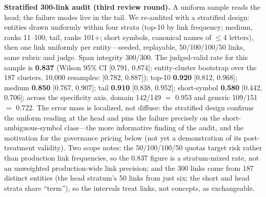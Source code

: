 \documentclass[preprint,12pt]{elsarticle}
\begin{document}
\textbf{Stratified 300-link audit (third review round).} A uniform
sample reads the head; the failure modes live in the tail. We
re-audited with a stratified design: entities drawn uniformly within
four strata (top-10 by link frequency; medium, ranks 11--100; tail,
ranks 101+; short symbols, canonical names of $\leq$4 letters), then one
link uniformly per entity---seeded, replayable, 50/100/100/50 links,
same rubric and judge. Span integrity 300/300. The judged-valid rate
for this sample is \textbf{0.837} (Wilson 95\% CI [0.791, 0.874];
entity-cluster bootstrap over the 187 clusters, 10{,}000 resamples:
[0.782, 0.887]);
top-10
\textbf{0.920} [0.812, 0.968]; medium \textbf{0.850} [0.767, 0.907];
tail \textbf{0.910} [0.838, 0.952]; short-symbol \textbf{0.580}
[0.442, 0.706]; across the specificity axis, domain 142/149 $=$ 0.953
and generic 109/151 $=$ 0.722. The error mass is localized, not
diffuse: the stratified design confirms the uniform reading at the head
and pins the failure precisely on the short-ambiguous-symbol
class---the more informative finding of the audit, and the motivation
for the governance pricing below (not yet a demonstration of its
post-treatment validity). Two scope notes: the 50/100/100/50 quotas
target risk rather than production link frequencies, so the 0.837
figure is a stratum-mixed rate, not an unweighted production-wide link
precision; and the 300 links come from 187 distinct entities (the head
stratum's 50 links from just six; the short and head strata share
``term''), so the intervals treat links, not concepts, as exchangeable.
\end{document}
